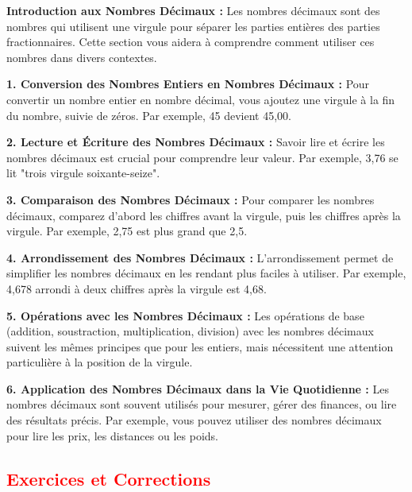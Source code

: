 \documentclass{article}
\begin{document}
\begin{tcolorbox}[colback=blue!10!white, colframe=blue!75!black, sharp corners=south, boxrule=0.8mm, title=Applications directes]
    \textbf{Introduction aux Nombres Décimaux :}
    Les nombres décimaux sont des nombres qui utilisent une virgule pour séparer les parties entières des parties fractionnaires. Cette section vous aidera à comprendre comment utiliser ces nombres dans divers contextes.

    \textbf{1. Conversion des Nombres Entiers en Nombres Décimaux :}
    Pour convertir un nombre entier en nombre décimal, vous ajoutez une virgule à la fin du nombre, suivie de zéros. Par exemple, 45 devient 45,00.

    \textbf{2. Lecture et Écriture des Nombres Décimaux :}
    Savoir lire et écrire les nombres décimaux est crucial pour comprendre leur valeur. Par exemple, 3,76 se lit "trois virgule soixante-seize".

    \textbf{3. Comparaison des Nombres Décimaux :}
    Pour comparer les nombres décimaux, comparez d'abord les chiffres avant la virgule, puis les chiffres après la virgule. Par exemple, 2,75 est plus grand que 2,5.

    \textbf{4. Arrondissement des Nombres Décimaux :}
    L'arrondissement permet de simplifier les nombres décimaux en les rendant plus faciles à utiliser. Par exemple, 4,678 arrondi à deux chiffres après la virgule est 4,68.

    \textbf{5. Opérations avec les Nombres Décimaux :}
    Les opérations de base (addition, soustraction, multiplication, division) avec les nombres décimaux suivent les mêmes principes que pour les entiers, mais nécessitent une attention particulière à la position de la virgule.

    \textbf{6. Application des Nombres Décimaux dans la Vie Quotidienne :}
    Les nombres décimaux sont souvent utilisés pour mesurer, gérer des finances, ou lire des résultats précis. Par exemple, vous pouvez utiliser des nombres décimaux pour lire les prix, les distances ou les poids.
\end{tcolorbox}

\subsection{\textcolor{red}{ Exercices et Corrections}}
\end{document}
